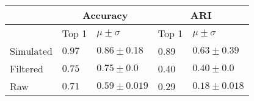 \begin{tabular}{lllll}
\toprule
{} & \multicolumn{2}{c}{Accuracy} &   \multicolumn{2}{c}{ARI} \\
\midrule
{} & Top 1 & $\mu \pm \sigma$ &  Top 1 & $\mu \pm \sigma$ \\
Simulated &  $0.97$&  $0.86 \pm 0.18 $ &  0.89 & $0.63 \pm 0.39 $ \\
Filtered  &   $0.75$  & $0.75 \pm 0.0$ &  0.40 & $0.40 \pm 0.0$ \\
Raw &   $0.71$ &  $0.59\pm 0.019$ & 0.29 & $0.18\pm 0.018$ \\
\bottomrule
\end{tabular}
